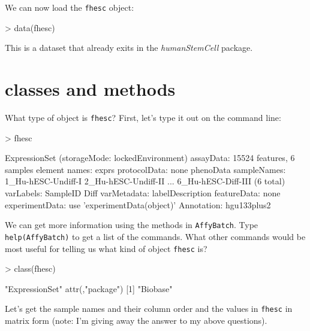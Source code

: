 \documentclass[12pt]{article}
\newcommand{\code}[1]{{\texttt{#1}}}
\begin{document}
We can now load the \code{fhesc} object:

\begin{Schunk}
\begin{Sinput}
> data(fhesc)
\end{Sinput}
\end{Schunk}

This is a dataset that already exits in the {\it humanStemCell} package.     

\section{classes and methods}

What type of object is \code{fhesc}?  First, let's type it out on the command line:

\begin{Schunk}
\begin{Sinput}
> fhesc
\end{Sinput}
\begin{Soutput}
ExpressionSet (storageMode: lockedEnvironment)
assayData: 15524 features, 6 samples 
  element names: exprs 
protocolData: none
phenoData
  sampleNames: 1_Hu-hESC-Undiff-I 2_Hu-hESC-Undiff-II ...
    6_Hu-hESC-Diff-III (6 total)
  varLabels: SampleID Diff
  varMetadata: labelDescription
featureData: none
experimentData: use 'experimentData(object)'
Annotation: hgu133plus2 
\end{Soutput}
\end{Schunk}

We can get more information using the methods in \code{AffyBatch}.  Type \code{help(AffyBatch)} to get a list of the commands.  What other commands would be most useful for telling us what kind of object \code{fhesc} is?    

\begin{Schunk}
\begin{Sinput}
> class(fhesc)
\end{Sinput}
\begin{Soutput}
[1] "ExpressionSet"
attr(,"package")
[1] "Biobase"
\end{Soutput}
\end{Schunk}

Let's get the sample names and their column order and the values in \code{fhesc} in matrix form (note: I'm giving away the answer to my above questions).  
\end{document}
